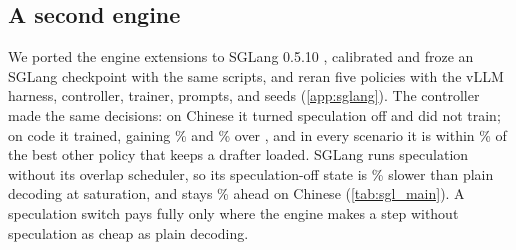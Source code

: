 \subsection{A second engine}\label{sec:sglang}

We ported the engine extensions to SGLang 0.5.10 \citep{zheng2024sglang}, calibrated and froze an SGLang checkpoint with the same scripts, and reran five policies with the vLLM harness, controller, trainer, prompts, and seeds (\cref{app:sglang}). The controller made the same decisions: on Chinese it turned speculation off and did not train; on code it trained, gaining \% and \% over , and in every scenario it is within \% of the best other policy that keeps a drafter loaded. SGLang runs speculation without its overlap scheduler, so its speculation-off state is \% slower than plain decoding at saturation, and  stays \% ahead on Chinese (\cref{tab:sgl_main}). A speculation switch pays fully only where the engine makes a step without speculation as cheap as plain decoding.
